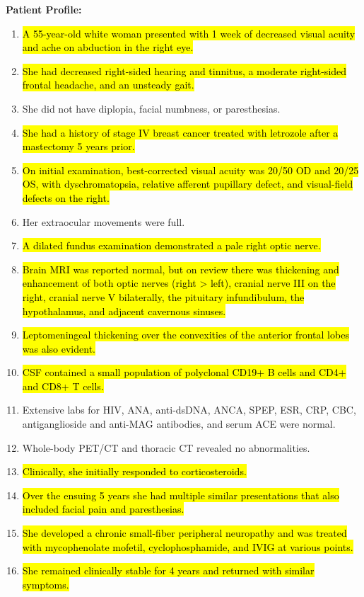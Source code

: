 \documentclass[11pt]{article}
\newcommand{\traineeHigh}[1]{\hl{#1}}
\begin{document}
\begin{tcolorbox}[colback=blue!3!white, colframe=blue!50!white,
                  title=Example of QA Data (from JAMA QA ID1266), left=10mm, breakable]
\small

\textbf{Patient Profile:}
\begin{enumerate}
  \item \traineeHigh{A 55-year-old white woman presented with 1 week of decreased visual acuity and ache on abduction in the right eye.}
  \item \traineeHigh{She had decreased right-sided hearing and tinnitus, a moderate right-sided frontal headache, and an unsteady gait.}
  \item She did not have diplopia, facial numbness, or paresthesias.
  \item \traineeHigh{She had a history of stage IV breast cancer treated with letrozole after a mastectomy 5 years prior.}
  \item \traineeHigh{On initial examination, best-corrected visual acuity was 20/50 OD and 20/25 OS, with dyschromatopsia, relative afferent pupillary defect, and visual-field defects on the right.}
  \item Her extraocular movements were full.
  \item \traineeHigh{A dilated fundus examination demonstrated a pale right optic nerve.}
  \item \traineeHigh{Brain MRI was reported normal, but on review there was thickening and enhancement of both optic nerves (right > left), cranial nerve III on the right, cranial nerve V bilaterally, the pituitary infundibulum, the hypothalamus, and adjacent cavernous sinuses.}
  \item \traineeHigh{Leptomeningeal thickening over the convexities of the anterior frontal lobes was also evident.}
  \item \traineeHigh{CSF contained a small population of polyclonal CD19+ B cells and CD4+ and CD8+ T cells.}
  \item Extensive labs for HIV, ANA, anti-dsDNA, ANCA, SPEP, ESR, CRP, CBC, antiganglioside and anti-MAG antibodies, and serum ACE were normal.
  \item Whole-body PET/CT and thoracic CT revealed no abnormalities.
  \item \traineeHigh{Clinically, she initially responded to corticosteroids.}
  \item \traineeHigh{Over the ensuing 5 years she had multiple similar presentations that also included facial pain and paresthesias.}
  \item \traineeHigh{She developed a chronic small-fiber peripheral neuropathy and was treated with mycophenolate mofetil, cyclophosphamide, and IVIG at various points.}
  \item \traineeHigh{She remained clinically stable for 4 years and returned with similar symptoms.}
\end{enumerate}


\end{tcolorbox}
\end{document}
